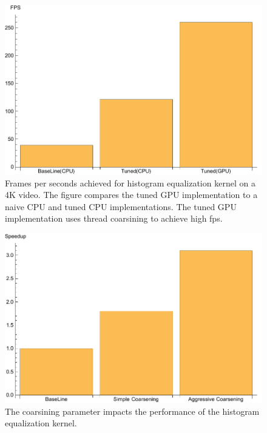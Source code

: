 \begin{figure}
\centering
\includegraphics[scale=0.5]{data/histogram.pdf}
\caption{Frames per seconds achieved for histogram equalization kernel on a 4K video. The figure compares the tuned GPU implementation to a naive CPU and tuned CPU implementations. The tuned GPU implementation uses thread coarsining to achieve high fps.}
\label{fig:histogram}
\centering
\end{figure}


\begin{figure}
\centering
\includegraphics[scale=0.5]{data/histogramc.pdf}
\caption{The coarsining parameter impacts the performance of the histogram equalization kernel.}
\label{fig:histogramCoarsining}
\centering
\end{figure}

